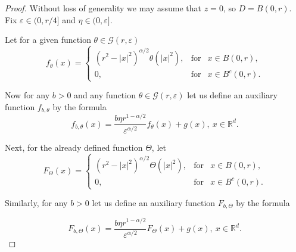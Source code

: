 \documentclass[a4paper,12pt,reqno]{amsart}
\theoremstyle{definition}
\theoremstyle{remark}
\newcommand{\eps}{\varepsilon}
\newcommand{\calG}{\mathcal{G}}
\newcommand{\R}{\mathds{R}}
\begin{document}
\begin{proof} 
Without loss of generality we may assume that $z = 0$, so $D = B(0,r)$. Fix $\eps \in (0,r/4]$ and $\eta \in (0,\eps]$.

Let for a given function $\theta \in \calG(r,\eps)$
\begin{equation*}
f_{\theta}(x)= \left\{              
\begin{array}{lll}                   
\displaystyle{ (r^2 - |x|^2)^{\alpha/2} \theta(|x|^2)},&\text{for}& x \in B(0,r), \\  
0,&\text{for}& x \in B^c(0,r).
\end{array}       
\right. 
\end{equation*}

Now for any $b > 0$ and any function $\theta \in \calG(r,\eps)$ let us define an auxiliary function $f_{b,\theta}$ by the formula
\begin{equation}
\label{f_b_definition}
f_{b,\theta}(x)= \frac{b \eta r^{1- \alpha/2}}{\eps^{\alpha/2}}f_{\theta}(x)+g(x),\ x\in\R^d.                 
\end{equation}

Next, for the already defined  function $\Theta$, let
\begin{equation}
\label{f_definition2}
F_{\Theta}(x)= \left\{              
\begin{array}{lll}                   
\displaystyle{ (r^2 - |x|^2)^{\alpha/2} \Theta(|x|^2)},&\text{for}& x \in B(0,r), \\  
0,&\text{for}& x \in B^c(0,r).
\end{array}       
\right. 
\end{equation}

Similarly, for any $b > 0$  let us define an auxiliary function $F_{b,\Theta}$ by the formula

\begin{equation}
\label{F_b_definition}
F_{b,\Theta}(x)= \frac{b \eta r^{1- \alpha/2}}{\eps^{\alpha/2}}F_{\Theta}(x)+g(x),\ x\in\R^d.                 
\end{equation}


\end{proof}
\end{document}
